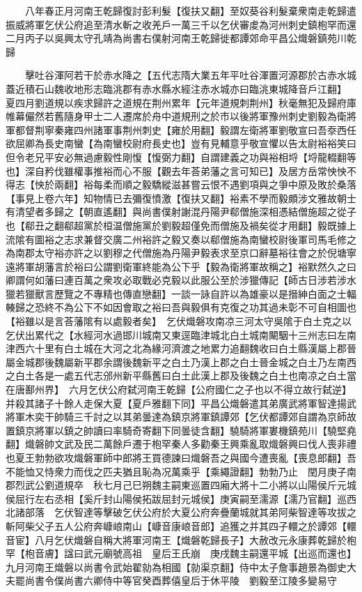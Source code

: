 　　八年春正月河南王乾歸復討彭利髮【復扶又翻】至奴葵谷利髮棄衆南走乾歸遣振威將軍乞伏公府追至清水斬之收羌戶一萬三千以乞伏審䖍為河州刺史鎮枹罕而還　二月丙子以吳興太守孔靖為尚書右僕射河南王乾歸徙都譚郊命平昌公熾磐鎮苑川乾歸

　　擊吐谷渾阿若干於赤水降之【五代志隋大業五年平吐谷渾置河源郡於古赤水城蓋近積石山魏收地形志臨洮郡有赤水縣水經注赤水城亦曰臨洮東城降音戶江翻】　夏四月劉道規以疾求歸許之道規在荆州累年【元年道規刺荆州】秋毫無犯及歸府庫帷幕儼然若舊隨身甲士二人遷席於舟中道規刑之於市以後將軍豫州刺史劉毅為衛將軍都督荆寧秦雍四州諸軍事荆州刺史【雍於用翻】毅謂左衛將軍劉敬宣曰吾沗西任欲屈卿為長史南蠻【為南蠻校尉府長史也】豈有見輔意乎敬宣懼以告太尉裕裕笑曰但令老兄平安必無過慮毅性剛愎【愎弼力翻】自謂建義之功與裕相埒【埒龍輟翻等也】深自矜伐雖權事推裕而心不服【觀去年荅弟藩之言可知已】及居方岳常怏怏不得志【怏於兩翻】裕每柔而順之毅驕縱滋甚嘗云恨不遇劉項與之爭中原及敗於桑落【事見上卷六年】知物情已去彌復憤激【復扶又翻】裕素不學而毅頗涉文雅故朝士有清望者多歸之【朝直遙翻】與尚書僕射謝混丹陽尹郗僧施深相憑結僧施超之從子也【郗丑之翻郗超黨於桓温僧施黨於劉毅超僅免而僧施及禍矣從才用翻】毅既據上流隂有圖裕之志求兼督交廣二州裕許之毅又奏以郗僧施為南蠻校尉後軍司馬毛修之為南郡太守裕亦許之以劉穆之代僧施為丹陽尹毅表求至京口辭墓裕往會之於倪塘寧遠將軍胡藩言於裕曰公謂劉衛軍終能為公下乎【毅為衛將軍故稱之】裕默然久之曰卿謂何如藩曰連百萬之衆攻必取戰必克毅以此服公至於涉獵傳記【師古日涉若涉水獵若獵獸言歷覽之不專精也傳直戀翻】一談一詠自許以為雄豪以是搢紳白面之士輻輳歸之恐終不為公下不如因會取之裕曰吾與毅俱有克復之功其過未彰不可自相圖也【裕雖以是言荅藩隂有以處毅者矣】　乞伏熾磐攻南凉三河太守吳隂于白土克之以乞伏出累代之【水經河水過邯川城南又東逕臨津城北白土城南闞駰十三州志曰左南津西六十里有白土城在大河之北為緣河濟渡之地累力追翻魏收曰白土縣漢屬上郡晉屬金城郡後魏屬新平郡余謂後魏新平之白土乃漢上郡之白土晉金城之白土乃左南西之白土各是一處五代志邠州新平縣舊曰白土此漢上郡及後魏之白土也南凉之白土當在唐鄯州界】　六月乞伏公府弑河南王乾歸【公府國仁之子也以不得立故行弑逆】并殺其諸子十餘人走保大夏【夏戶雅翻下同】平昌公熾磐遣其弟廣武將軍智達揚武將軍木奕干帥騎三千討之以其弟曇達為鎮京將軍鎮譚郊【乞伏都譚郊自謂為京師故置鎮京將軍以鎮之帥讀曰率騎奇寄翻下同曇徒含翻】驍騎將軍婁機鎮苑川【驍堅堯翻】熾磐帥文武及民二萬餘戶遷于枹罕秦人多勸秦王興乘亂取熾磐興曰伐人喪非禮也夏王勃勃欲攻熾磐軍師中郎將王買德諫曰熾磐吾之與國今遭喪亂【喪息郎翻】吾不能恤又恃衆力而伐之匹夫猶且恥為况萬乘乎【乘繩證翻】勃勃乃止　閏月庚子南郡烈武公劉道規卒　秋七月己巳朔魏主嗣東巡置四廂大將十二小將以山陽侯斤元城侯屈行左右丞相【奚斤封山陽侯拓跋屈封元城侯】庚寅嗣至濡源【濡乃官翻】巡西北諸部落　乞伏智達等擊破乞伏公府於大夏公府奔疊蘭城就其弟阿柴智達等攻拔之斬阿柴父子五人公府奔嵻㟍南山【嵻音康㟍音郎】追獲之并其四子轘之於譚郊【轘音宦】八月乞伏熾磐自稱大將軍河南王【熾磐乾歸長子】大赦改元永康葬乾歸於枹罕【枹音膚】諡曰武元廟號高祖　皇后王氏崩　庚戌魏主嗣還平城【出巡而還也】　九月河南王熾磐以尚書令武始翟勍為相國【勍渠京翻】侍中太子詹事趙景為御史大夫罷尚書令僕尚書六卿侍中等官癸酉葬僖皇后于休平陵　劉毅至江陵多變易守

